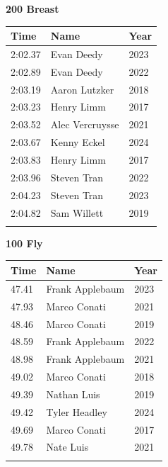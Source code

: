 \hfill
\begin{minipage}[t]{0.48\textwidth}
\centering
\textbf{\textcolor{teamprimary}{200 Breast}}\par
\vspace{0.5em}
\centering
\small
\renewcommand{\arraystretch}{1.0}
\setlength{\tabcolsep}{4pt}
\begin{tabular}{@{}p{1.8cm}p{3.0cm}p{1.0cm}@{}}
\toprule
\textbf{Time} & \textbf{Name} & \textbf{Year} \\
\midrule
2:02.37 & Evan Deedy & 2023 \\
2:02.89 & Evan Deedy & 2022 \\
2:03.19 & Aaron Lutzker & 2018 \\
2:03.23 & Henry Limm & 2017 \\
2:03.52 & Alec Vercruysse & 2021 \\
2:03.67 & Kenny Eckel & 2024 \\
2:03.83 & Henry Limm & 2017 \\
2:03.96 & Steven Tran & 2022 \\
2:04.23 & Steven Tran & 2023 \\
2:04.82 & Sam Willett & 2019 \\
\bottomrule
\vspace{0.5em}
\end{tabular}
\end{minipage}
\vspace{1.2em}
\noindent\begin{minipage}[t]{0.48\textwidth}
\centering
\textbf{\textcolor{teamprimary}{100 Fly}}\par
\vspace{0.5em}
\centering
\small
\renewcommand{\arraystretch}{1.0}
\setlength{\tabcolsep}{4pt}
\begin{tabular}{@{}p{1.8cm}p{3.0cm}p{1.0cm}@{}}
\toprule
\textbf{Time} & \textbf{Name} & \textbf{Year} \\
\midrule
47.41 & Frank Applebaum & 2023 \\
47.93 & Marco Conati & 2021 \\
48.46 & Marco Conati & 2019 \\
48.59 & Frank Applebaum & 2022 \\
48.98 & Frank Applebaum & 2021 \\
49.02 & Marco Conati & 2018 \\
49.39 & Nathan Luis & 2019 \\
49.42 & Tyler Headley & 2024 \\
49.69 & Marco Conati & 2017 \\
49.78 & Nate Luis & 2021 \\
\bottomrule
\vspace{0.5em}
\end{tabular}
\end{minipage}
